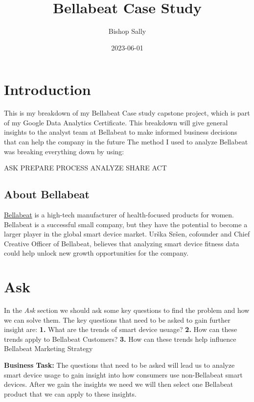 \documentclass[
]{article}
\title{Bellabeat Case Study}
\author{Bishop Sally}
\date{2023-06-01}
\begin{document}
\maketitle

\hypertarget{introduction}{%
\section{\texorpdfstring{\textbf{Introduction}}{Introduction}}\label{introduction}}

This is my breakdown of my Bellabeat Case study capstone project, which
is part of my Google Data Analytics Certificate. This breakdown will
give general insights to the analyst team at Bellabeat to make informed
business decisions that can help the company in the future The method I
used to analyze Bellabeat was breaking everything down by using:

ASK PREPARE PROCESS ANALYZE SHARE ACT

\hypertarget{about-bellabeat}{%
\subsection{\texorpdfstring{\textbf{About
Bellabeat}}{About Bellabeat}}\label{about-bellabeat}}

\href{https://bellabeat.com/?gclid=CjwKCAjwg-GjBhBnEiwAMUvNW8dU3gg_7xVeMp_WV-1Acp6kc_57Kj7kPTRdLJCLFy2Cq3PRWln7cRoCep0QAvD_BwE}{Bellabeat}
is a high-tech manufacturer of health-focused products for women.
Bellabeat is a successful small company, but they have the potential to
become a larger player in the global smart device market. Urška Sršen,
cofounder and Chief Creative Officer of Bellabeat, believes that
analyzing smart device fitness data could help unlock new growth
opportunities for the company.

\hypertarget{ask}{%
\section{\texorpdfstring{\textbf{Ask}}{Ask}}\label{ask}}

In the \emph{Ask} section we should ask some key questions to find the
problem and how we can solve them. The key questions that need to be
asked to gain further insight are: \textbf{1.} What are the trends of
smart device usuage? \textbf{2.} How can these trends apply to Bellabeat
Customers? \textbf{3.} How can these trends help influence Bellabeat
Marketing Strategy

\textbf{Business Task:} The questions that need to be asked will lead us
to analyze smart device usage to gain insight into how consumers use
non-Bellabeat smart devices. After we gain the insights we need we will
then select one Bellabeat product that we can apply to these insights.
\end{document}
